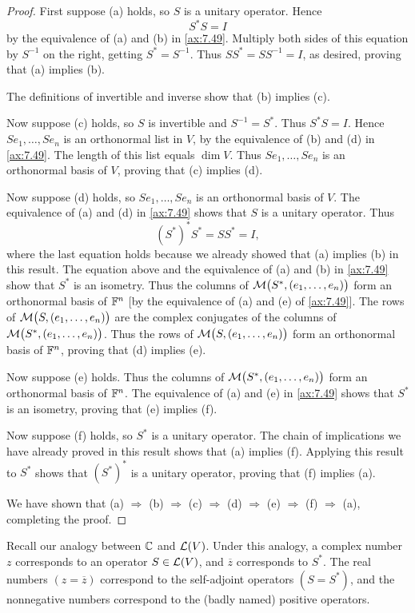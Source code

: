 \begin{proof}
First suppose (a) holds, so $S$ is a unitary operator. Hence
\[ S^*S=I \]
by the equivalence of (a) and (b) in \ref{ax:7.49}. Multiply both sides of this
equation by $S^{-1}$ on the right, getting $S^*=S^{-1}$. Thus
$SS^*=SS^{-1}=I$, as desired, proving that (a) implies (b).

The definitions of invertible and inverse show that (b) implies (c).

Now suppose (c) holds, so $S$ is invertible and $S^{-1}=S^*$. Thus $S^*S=I$.
Hence $Se_1,\dots,Se_n$ is an orthonormal list in $V$, by the equivalence of (b)
and (d) in \ref{ax:7.49}. The length of this list equals $\dim V$. Thus
$Se_1,\dots,Se_n$ is an orthonormal basis of $V$, proving that (c) implies (d).

Now suppose (d) holds, so $Se_1,\dots,Se_n$ is an orthonormal basis of $V$. The
equivalence of (a) and (d) in \ref{ax:7.49} shows that $S$ is a unitary
operator. Thus
\[ (S^*)^*S^*=SS^*=I, \]
where the last equation holds because we already showed that (a) implies (b) in
this result. The equation above and the equivalence of (a) and (b) in
\ref{ax:7.49} show that $S^*$ is an isometry. Thus the columns of
$\mathcal{M}\bigl(S^*,(e_1,\dots,e_n)\bigr)$ form an orthonormal basis of $\mathbb{F}^n$ [by the
equivalence of (a) and (e) of \ref{ax:7.49}]. The rows of
$\mathcal{M}\bigl(S,(e_1,\dots,e_n)\bigr)$ are the complex conjugates of the columns of
$\mathcal{M}\bigl(S^*,(e_1,\dots,e_n)\bigr)$. Thus the rows of
$\mathcal{M}\bigl(S,(e_1,\dots,e_n)\bigr)$ form an orthonormal basis of $\mathbb{F}^n$, proving
that (d) implies (e).

Now suppose (e) holds. Thus the columns of $\mathcal{M}\bigl(S^*,(e_1,\dots,e_n)\bigr)$
form an orthonormal basis of $\mathbb{F}^n$. The equivalence of (a) and (e) in
\ref{ax:7.49} shows that $S^*$ is an isometry, proving that (e) implies (f).

Now suppose (f) holds, so $S^*$ is a unitary operator. The chain of implications
we have already proved in this result shows that (a) implies (f). Applying this
result to $S^*$ shows that $(S^*)^*$ is a unitary operator, proving that (f)
implies (a).

We have shown that (a) $\Rightarrow$ (b) $\Rightarrow$ (c) $\Rightarrow$ (d)
$\Rightarrow$ (e) $\Rightarrow$ (f) $\Rightarrow$ (a), completing the proof.
\end{proof}

Recall our analogy between $\mathbb{C}$ and $\mathcal{L}(V)$. Under this analogy, a complex
number $z$ corresponds to an operator $S\in\mathcal{L}(V)$, and $\overline{z}$
corresponds to $S^*$. The real numbers $(z=\overline{z})$ correspond to the
self-adjoint operators $(S=S^*)$, and the nonnegative numbers correspond to the
(badly named) positive operators.

